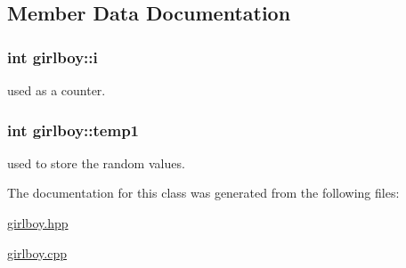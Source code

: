 \subsection{Member Data Documentation}
\hypertarget{classgirlboy_a20a7a80e099f3a1400b56dfb60fae9f9}{
\subsubsection[{i}]{\setlength{\rightskip}{0pt plus 5cm}int girlboy\-::i}}\label{classgirlboy_a20a7a80e099f3a1400b56dfb60fae9f9}


used as a counter. 

\hypertarget{classgirlboy_a0927228af897d2e3ece712c830ad769d}{
\subsubsection[{temp1}]{\setlength{\rightskip}{0pt plus 5cm}int girlboy\-::temp1}}\label{classgirlboy_a0927228af897d2e3ece712c830ad769d}


used to store the random values. 



The documentation for this class was generated from the following files\-:\begin{DoxyCompactItemize}
\item 
\hyperlink{girlboy_8hpp}{girlboy.\-hpp}\item 
\hyperlink{girlboy_8cpp}{girlboy.\-cpp}\end{DoxyCompactItemize}
